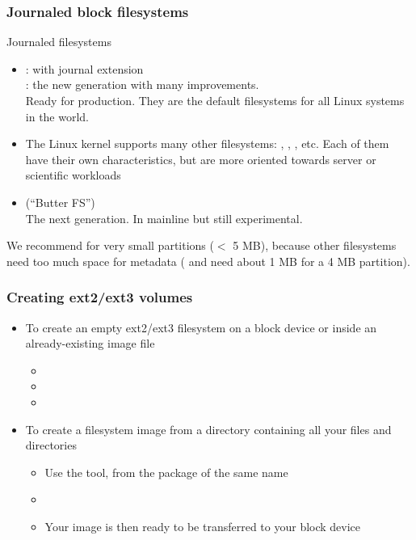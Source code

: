 \begin{frame}
  \frametitle{Journaled block filesystems}
  Journaled filesystems
  \begin{itemize}
  \item {}:  with journal extension\\
    : the new generation with many improvements.\\
    Ready for production. They are the default filesystems for all
    Linux systems in the world.
  \item The Linux kernel supports many other filesystems:
    , , , etc.  Each of them have
    their own characteristics, but are more oriented towards server or
    scientific workloads
  \item {} (``Butter FS'')\\
    The next generation. In mainline but still experimental.
  \end{itemize}
  We recommend  for very small partitions ($<$ 5 MB),
  because other filesystems need too much space for metadata
  ( and  need about 1 MB for a 4 MB partition). 
\end{frame}

\begin{frame}
  \frametitle{Creating ext2/ext3 volumes}
  \begin{itemize}
  \item To create an empty ext2/ext3 filesystem on a block device or
    inside an already-existing image file
    \begin{itemize}
    \item {}
    \item {}
    \item {}
    \end{itemize}
  \item To create a filesystem image from a directory containing all
    your files and directories
    \begin{itemize}
    \item Use the  tool, from the package of the same name
    \item {}
    \item Your image is then ready to be transferred to your block
      device
    \end{itemize}
  \end{itemize}
\end{frame}

